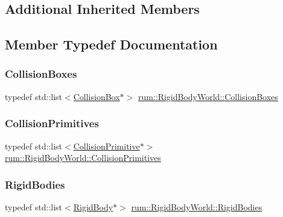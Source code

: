 \subsection*{Additional Inherited Members}


\subsection{Member Typedef Documentation}
\mbox{\label{classrum_1_1_rigid_body_world_a61fdadb1dd461f21c67f82c35ff08d1e}} 
\subsubsection{\texorpdfstring{Collision\+Boxes}{CollisionBoxes}}
{\footnotesize\ttfamily typedef std\+::list$<$\hyperlink{classrum_1_1_collision_box}{Collision\+Box}$\ast$$>$ \hyperlink{classrum_1_1_rigid_body_world_a61fdadb1dd461f21c67f82c35ff08d1e}{rum\+::\+Rigid\+Body\+World\+::\+Collision\+Boxes}}

\mbox{\label{classrum_1_1_rigid_body_world_aac4ad352eb6647e1055b306c8dad6640}} 
\subsubsection{\texorpdfstring{Collision\+Primitives}{CollisionPrimitives}}
{\footnotesize\ttfamily typedef std\+::list$<$\hyperlink{classrum_1_1_collision_primitive}{Collision\+Primitive}$\ast$$>$ \hyperlink{classrum_1_1_rigid_body_world_aac4ad352eb6647e1055b306c8dad6640}{rum\+::\+Rigid\+Body\+World\+::\+Collision\+Primitives}}

\mbox{\label{classrum_1_1_rigid_body_world_afe5860f7166496b2adca2b8febe24b00}} 
\subsubsection{\texorpdfstring{Rigid\+Bodies}{RigidBodies}}
{\footnotesize\ttfamily typedef std\+::list$<$\hyperlink{classrum_1_1_rigid_body}{Rigid\+Body}$\ast$$>$ \hyperlink{classrum_1_1_rigid_body_world_afe5860f7166496b2adca2b8febe24b00}{rum\+::\+Rigid\+Body\+World\+::\+Rigid\+Bodies}}



